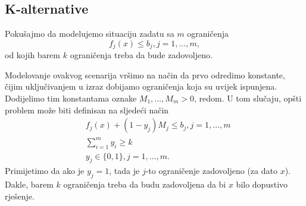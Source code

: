 \documentclass[a4paper, utf8, 11pt, colorlinks]{book}
\theoremstyle{definition}
\begin{document}

\subsection{K-alternative} 

Pokušajmo da modelujemo situaciju zadatu sa $m$ ograničenja
$$f_j(x) \leq  b_j, j=1,\ldots,m,$$
od kojih barem $k$ ograničenja treba da bude zadovoljeno.

 Modelovanje ovakvog scenarija vršimo na način da prvo odredimo konstante, čijim uključivanjem u izraz dobijamo ograničenja koja su uvijek ispunjena. Dodijelimo tim konstantama oznake  $M_1, \ldots, M_m>0$, redom. U tom slučaju, opšti problem može biti definisan na sljedeći način
\begin{align}
     &f_j(x) + (1-y_j) M_j \leq b_j, j=1,\ldots,m\\
     & \sum_{i=1}^m y_i \geq k \\
     & y_j \in \{0,1\}, j=1,\ldots,m.
\end{align}
Primijetimo da ako je $y_j = 1$, tada je $j$-to ograničenje zadovoljeno (za dato $x$). Dakle, barem $k$ ograničenja treba da budu zadovoljena da bi $x$ bilo dopustivo rješenje. 

\end{document}
